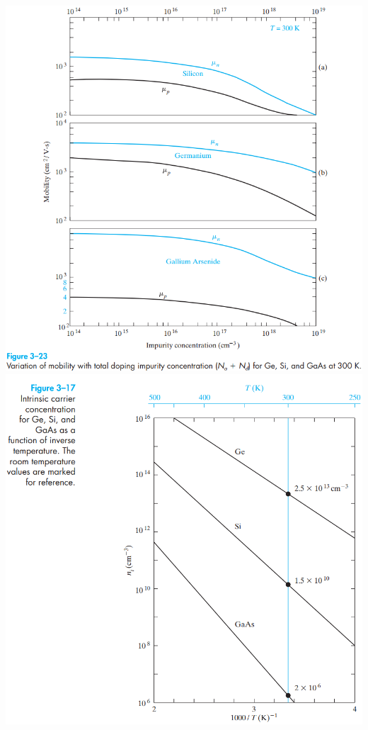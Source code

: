 \documentclass[12pt]{article}
\begin{document}
\begin{small}
		\begin{center}
		\includegraphics[width=\textwidth]{fig1}
		\includegraphics[width=\textwidth]{fig2}

\end{center}
\end{small}
\end{document}
